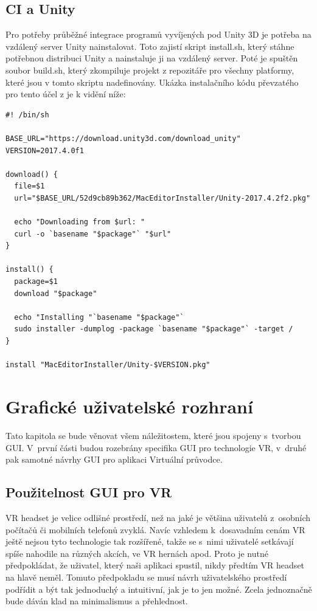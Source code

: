 \documentclass[thesis=B,czech]{FITthesis}[2012/06/26]
\begin{document}
\subsection{CI a Unity}
Pro potřeby průběžné integrace programů vyvíjených pod Unity 3D je potřeba na vzdálený server Unity nainstalovat. Toto zajistí skript install.sh, který stáhne potřebnou distribuci Unity a nainstaluje ji na vzdálený server. Poté je spuštěn soubor build.sh, který zkompiluje projekt z repozitáře pro všechny platformy, které jsou v tomto skriptu nadefinovány. Ukázka instalačního kódu převzatého pro tento účel z \cite{travis} je k vidění níže:

\begin{lstlisting}[frame=single]
#! /bin/sh

BASE_URL="https://download.unity3d.com/download_unity"
VERSION=2017.4.0f1

download() {
  file=$1
  url="$BASE_URL/52d9cb89b362/MacEditorInstaller/Unity-2017.4.2f2.pkg"

  echo "Downloading from $url: "
  curl -o `basename "$package"` "$url"
}

install() {
  package=$1
  download "$package"

  echo "Installing "`basename "$package"`
  sudo installer -dumplog -package `basename "$package"` -target /
}

install "MacEditorInstaller/Unity-$VERSION.pkg"
\end{lstlisting}

	\section{Grafické uživatelské rozhraní}
	\label{sec:GUI}
	
	Tato kapitola se bude věnovat všem náležitostem, které jsou spojeny s~tvorbou GUI. V~první části budou rozebrány specifika GUI pro technologie VR, v~druhé pak samotné návrhy GUI pro aplikaci Virtuální průvodce.
	
	
	\subsection{Použitelnost GUI pro VR}
VR headset je velice odlišné prostředí, než na jaké je většina uživatelů z~osobních počítačů či mobilních telefonů zvyklá. Navíc vzhledem k~dosavadním cenám VR ještě nejsou tyto technologie tak rozšířené, takže se s~nimi uživatelé setkávají spíše nahodile na různých akcích, ve VR hernách apod. Proto je nutné předpokládat, že uživatel, který naši aplikaci spustil, nikdy předtím VR headset na hlavě neměl. Tomuto předpokladu se musí návrh uživatelského prostředí podřídit a být tak jednoduchý a intuitivní, jak je to jen možné. Zcela jednoznačně bude dáván klad na minimalismus a přehlednost.
	
\end{document}

